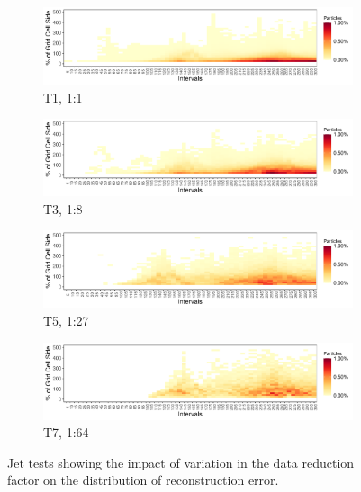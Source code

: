 \begin{figure}[!b]
\begin{subfigure}{\linewidth}
\centering
\includegraphics[width=\linewidth]{Images/Jet_Intervals_T1_Percent.pdf}
\caption{T1, 1:1}
\label{fig:jet_1}
\end{subfigure}
\begin{subfigure}{\linewidth}
\centering
\includegraphics[width=\linewidth]{Images/Jet_Intervals_T3_Percent.pdf}
\caption{T3, 1:8}
\label{fig:jet_3}
\end{subfigure}
\begin{subfigure}{\linewidth}
\centering
\includegraphics[width=\linewidth]{Images/Jet_Intervals_T5_Percent.pdf}
\caption{T5, 1:27}
\label{fig:jet_5}
\end{subfigure}
\begin{subfigure}{\linewidth}
\centering
\includegraphics[width=\linewidth]{Images/Jet_Intervals_T7_Percent.pdf}
\caption{T7, 1:64}
\label{fig:jet_7}
\end{subfigure}
\caption{Jet tests showing the impact of variation in the data reduction factor on the distribution of reconstruction error.}
\label{fig:jet_map}
\end{figure}
